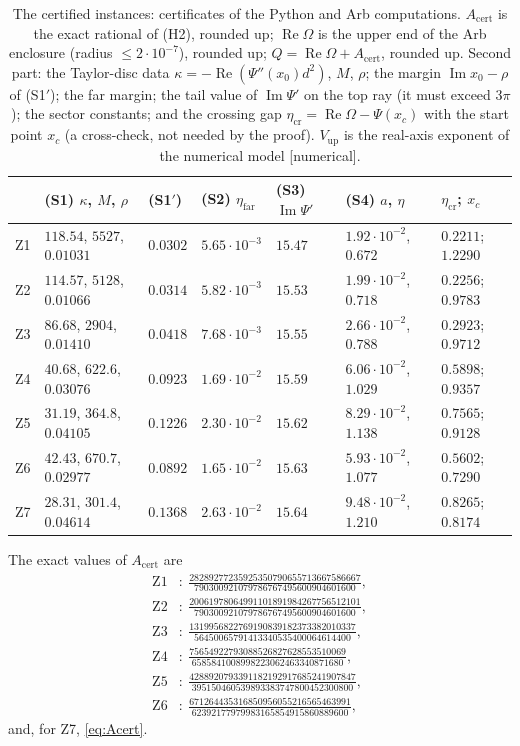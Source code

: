 \documentclass[11pt]{amsart}
\theoremstyle{definition}
\theoremstyle{remark}
\numberwithin{equation}{section}
\newcommand{\Acert}{A_{\mathrm{cert}}}
\newcommand{\etafar}{\eta_{\mathrm{far}}}
\renewcommand{\Re}{\operatorname{Re}}
\renewcommand{\Im}{\operatorname{Im}}
\begin{document}
\begin{table}[ht]
\medskip
\begin{tabular}{@{}lllllll@{}}
\toprule
 & (S1) $\kappa$, $M$, $\rho$ & (S1$'$) & (S2) $\etafar$ & (S3) $\Im\Psi'$ & (S4) $a$, $\eta$ & $\eta_{\mathrm{cr}}$; $x_c$\\
\midrule
Z1 & $118.54$, $5527$, $0.01031$ & $0.0302$ & $5.65\cdot10^{-3}$ & $15.47$ & $1.92\cdot10^{-2}$, $0.672$ & $0.2211$; $1.2290$\\
Z2 & $114.57$, $5128$, $0.01066$ & $0.0314$ & $5.82\cdot10^{-3}$ & $15.53$ & $1.99\cdot10^{-2}$, $0.718$ & $0.2256$; $0.9783$\\
Z3 & $86.68$, $2904$, $0.01410$ & $0.0418$ & $7.68\cdot10^{-3}$ & $15.55$ & $2.66\cdot10^{-2}$, $0.788$ & $0.2923$; $0.9712$\\
Z4 & $40.68$, $622.6$, $0.03076$ & $0.0923$ & $1.69\cdot10^{-2}$ & $15.59$ & $6.06\cdot10^{-2}$, $1.029$ & $0.5898$; $0.9357$\\
Z5 & $31.19$, $364.8$, $0.04105$ & $0.1226$ & $2.30\cdot10^{-2}$ & $15.62$ & $8.29\cdot10^{-2}$, $1.138$ & $0.7565$; $0.9128$\\
Z6 & $42.43$, $670.7$, $0.02977$ & $0.0892$ & $1.65\cdot10^{-2}$ & $15.63$ & $5.93\cdot10^{-2}$, $1.077$ & $0.5602$; $0.7290$\\
Z7 & $28.31$, $301.4$, $0.04614$ & $0.1368$ & $2.63\cdot10^{-2}$ & $15.64$ & $9.48\cdot10^{-2}$, $1.210$ & $0.8265$; $0.8174$\\
\bottomrule
\end{tabular}
\caption{The certified instances: certificates of the Python and Arb computations. $\Acert$ is the exact rational
of (H2), rounded up; $\Re\Omega$ is the upper end of the Arb enclosure (radius $\le2\cdot10^{-7}$), rounded up;
$Q=\Re\Omega+\Acert$, rounded up. Second part: the Taylor-disc data $\kappa=-\Re(\Psi''(x_0)d^2)$, $M$, $\rho$; the margin
$\Im x_0-\rho$ of (S1$'$); the far margin; the tail value of $\Im\Psi'$ on the top ray (it must exceed $3\pi$); the
sector constants; and the crossing gap $\eta_{\mathrm{cr}}=\Re\Omega-\Psi(x_c)$ with the start point $x_c$ (a cross-check,
not needed by the proof). $V_{\mathrm{up}}$ is
the real-axis exponent of the numerical model [numerical].}\label{tab:certs}
\end{table}

The exact values of $\Acert$ are
\begin{align*}
\text{Z1}&:\ \tfrac{28289277235925350790655713667586667}{790300921079786767495600904601600},\\
\text{Z2}&:\ \tfrac{20061978064991101891984267756512101}{790300921079786767495600904601600},\\
\text{Z3}&:\ \tfrac{1319956822769190839182373382010337}{56450065791413340535400064614400},\\
\text{Z4}&:\ \tfrac{75654922793088526827628553510069}{6585841008998223062463340871680},\\
\text{Z5}&:\ \tfrac{4288920793391182192917685241907847}{395150460539893383747800452300800},\\
\text{Z6}&:\ \tfrac{671264435316850956055216565463991}{62392177979983165854915860889600},
\end{align*}
and, for Z7, \eqref{eq:Acert}.
\end{document}

